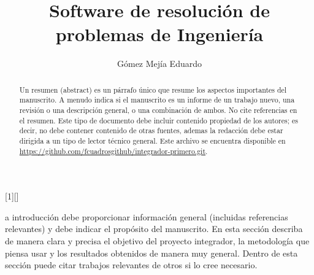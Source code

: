 \documentclass{IEEEcsmag}
\begin{document}
[1][]
{}
{}



\title{Software de resolución de problemas de Ingeniería }

\author{}

\author{}

\author{}

\author{}

\author{Gómez Mejía Eduardo}



\begin{abstract}
Un resumen (abstract) es un párrafo único que resume los aspectos importantes del manuscrito. A menudo indica si el manuscrito es un informe de un trabajo nuevo, una revisión o una descripción general, o una combinación de ambos. No cite referencias en el resumen. Este tipo de documento debe incluir contenido propiedad de los autores; es decir, no debe contener contenido de otras fuentes, ademas la redacción debe  estar dirigida a un tipo de lector técnico general. Este archivo se encuentra disponible en \href{https://github.com/fcuadrosgithub/integrador-primero.git}{https://github.com/fcuadrosgithub/integrador-primero.git}.
\end{abstract}

\maketitle
{}a introducción debe proporcionar información general (incluidas referencias relevantes) y debe indicar el propósito del manuscrito. En esta sección describa de manera clara y precisa el objetivo del proyecto integrador, la metodología que piensa usar y los resultados obtenidos de manera muy general. Dentro de esta sección puede citar trabajos relevantes de otros si lo cree necesario.
\end{document}
